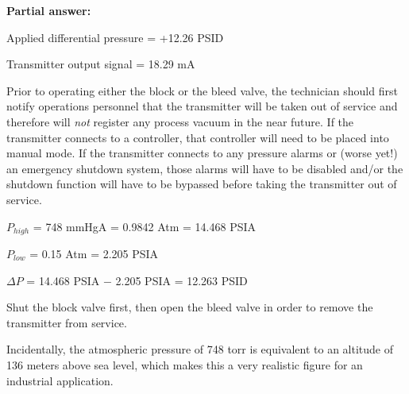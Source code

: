 





\noindent
{\bf Partial answer:}

\vskip 10pt

Applied differential pressure = +12.26 PSID

\vskip 10pt

Transmitter output signal = 18.29 mA

\vskip 10pt

Prior to operating either the block or the bleed valve, the technician should first notify operations personnel that the transmitter will be taken out of service and therefore will {\it not} register any process vacuum in the near future.  If the transmitter connects to a controller, that controller will need to be placed into manual mode.  If the transmitter connects to any pressure alarms or (worse yet!) an emergency shutdown system, those alarms will have to be disabled and/or the shutdown function will have to be bypassed before taking the transmitter out of service.







$P_{high}$ = 748 mmHgA = 0.9842 Atm = 14.468 PSIA 

$P_{low}$ = 0.15 Atm = 2.205 PSIA

$\Delta P$ = 14.468 PSIA $-$ 2.205 PSIA = 12.263 PSID

\vskip 10pt

Shut the block valve first, then open the bleed valve in order to remove the transmitter from service.

\vskip 10pt

Incidentally, the atmospheric pressure of 748 torr is equivalent to an altitude of 136 meters above sea level, which makes this a very realistic figure for an industrial application.




